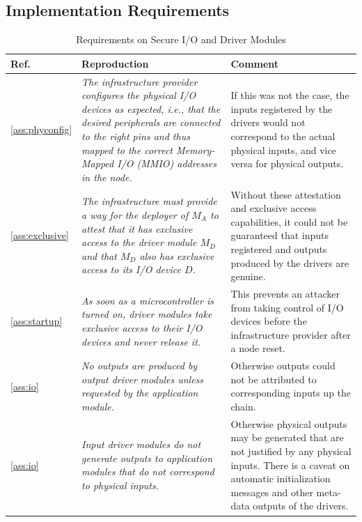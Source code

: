 \pagebreak
\subsection{Implementation Requirements}
\label{app:req}


\begin{longtable}{|p{}|p{}|p{}|}
\caption{Requirements on Secure I/O and Driver Modules}\\
\hline
Ref. & Reproduction & Comment \\
\hline
\hline

\ref{ass:phyconfig} &
\em The infrastructure provider configures the physical I/O devices as expected, i.e., that the desired peripherals are connected to the right pins and thus mapped to the correct Memory-Mapped I/O (MMIO) addresses in the node. &
If this was not the case, the inputs registered by the drivers would not correspond to the actual physical inputs, and vice versa for physical outputs.\\
\hline

\ref{ass:exclusive} & 
\em The infrastructure must provide a way for the deployer of $M_A$ to attest that it has exclusive access to the driver module $M_D$ and that $M_D$ also has exclusive access to its I/O device $D$. & 
Without these attestation and exclusive access capabilities, it could not be guaranteed that inputs registered and outputs produced by the drivers are genuine. \\
\hline

\ref{ass:startup} & 
\em As soon as a microcontroller is turned on, driver modules take exclusive access to their I/O devices and never release it. &
This prevents an attacker from taking control of I/O devices before the infrastructure provider after a node reset. \\
\hline

\ref{ass:io} &
\em No outputs are produced by output driver modules unless requested by the application module. &
Otherwise outputs could not be attributed to corresponding inputs up the chain. \\
\hline

\ref{ass:io} &
\em Input driver modules do not generate outputs to application modules that do not correspond to physical inputs. & 
Otherwise physical outputs may be generated that are not justified by any physical inputs. There is a caveat on automatic initialization messages and other meta-data outputs of the drivers.\\
\hline

\end{longtable}

